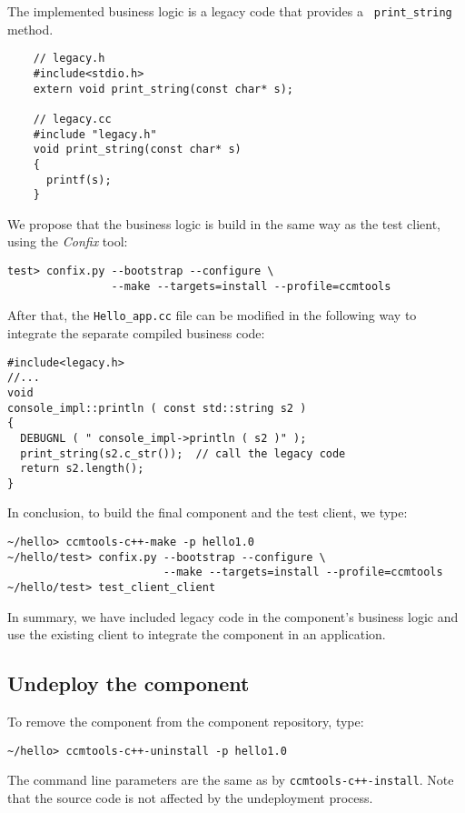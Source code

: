\noindent
The implemented business logic is a legacy code that provides a {\tt
print\_string} method.
\begin{verbatim}
    // legacy.h	
    #include<stdio.h>
    extern void print_string(const char* s);

    // legacy.cc
    #include "legacy.h"
    void print_string(const char* s)
    {
      printf(s);
    }
\end{verbatim}

\noindent
We propose that the business logic is build in the same way as the test client,
using the {\it Confix} tool:
\begin{verbatim}
test> confix.py --bootstrap --configure \
                --make --targets=install --profile=ccmtools
\end{verbatim}

\noindent
After that, the {\tt Hello\_app.cc} file can be modified in the following way to
integrate the separate compiled business code:
\begin{verbatim}
#include<legacy.h>
//...
void
console_impl::println ( const std::string s2 )
{
  DEBUGNL ( " console_impl->println ( s2 )" );
  print_string(s2.c_str());  // call the legacy code
  return s2.length();
}
\end{verbatim}

\noindent
In conclusion, to build the final component and the test client, we type:
\begin{verbatim}
~/hello> ccmtools-c++-make -p hello1.0
~/hello/test> confix.py --bootstrap --configure \
                        --make --targets=install --profile=ccmtools
~/hello/test> test_client_client
\end{verbatim}

\noindent
In summary, we have included legacy code in the component's business logic and
use the existing client to integrate the component in an application.


\subsection{Undeploy the component}

To remove the component from the component repository, type:
\begin{verbatim}
~/hello> ccmtools-c++-uninstall -p hello1.0
\end{verbatim}
The command line parameters are the same as by {\tt ccmtools-c++-install}. Note
that the source code is not affected by the undeployment process.




